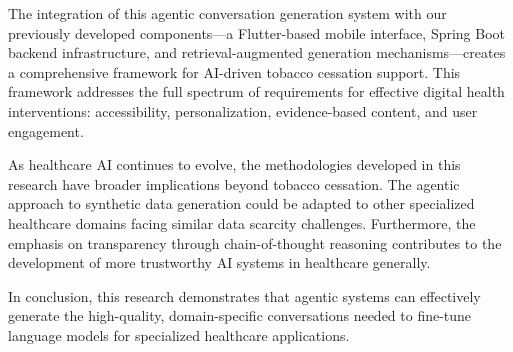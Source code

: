 The integration of this agentic conversation generation system with our previously developed components—a Flutter-based mobile interface, Spring Boot backend infrastructure, and retrieval-augmented generation mechanisms—creates a comprehensive framework for AI-driven tobacco cessation support. This framework addresses the full spectrum of requirements for effective digital health interventions: accessibility, personalization, evidence-based content, and user engagement.

As healthcare AI continues to evolve, the methodologies developed in this research have broader implications beyond tobacco cessation. The agentic approach to synthetic data generation could be adapted to other specialized healthcare domains facing similar data scarcity challenges. Furthermore, the emphasis on transparency through chain-of-thought reasoning contributes to the development of more trustworthy AI systems in healthcare generally.

In conclusion, this research demonstrates that agentic systems can effectively generate the high-quality, domain-specific conversations needed to fine-tune language models for specialized healthcare applications.
